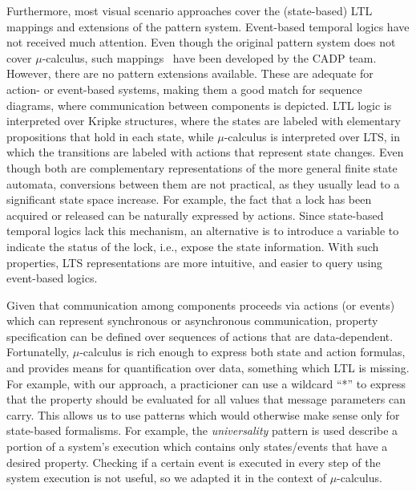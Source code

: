 \documentclass[letter]{llncs}
\begin{document}
Furthermore, most visual scenario approaches cover the (state-based) LTL mappings and extensions of the pattern system. 
Event-based temporal logics have not received much attention. Even though the original pattern 
system does not cover $\mu$-calculus, such mappings~\cite{RAFMC} have been developed by the CADP team.
However, there are no pattern extensions available. These are adequate for action- or event-based systems,
making them a good match for sequence diagrams, where communication between components is depicted.
LTL logic is interpreted over Kripke structures, where the states are labeled with elementary 
propositions that hold in each state, while $\mu$-calculus is interpreted over LTS, in which the transitions
are labeled with actions that represent state changes.
Even though both are complementary representations of the more general finite state automata, 
conversions between them are not practical, as they usually lead to a significant state space increase. 
For example, the fact that a lock has
been acquired or released can be naturally expressed by actions. Since state-based
temporal logics lack this mechanism, an alternative is to introduce a variable to indicate
the status of the lock, i.e., expose the state information. With such properties, LTS
representations are more intuitive, and easier to query using event-based logics.

Given that communication among components proceeds via actions (or events) which can
represent synchronous or asynchronous communication, property specification
can be defined over sequences of actions that are data-dependent.
Fortunatelly, $\mu$-calculus is rich enough to express both state and action formulas,
and provides means for quantification over data, something which LTL is missing. 
For example, with our approach, a practicioner can use 
a wildcard ``*'' to express that the property should be evaluated for all values
that message parameters can carry. This allows us to use patterns which would otherwise
make sense only for state-based formalisms. For example, the \emph{universality}
pattern is used describe a portion of a system's execution which contains only states/events that have a desired property.
Checking if a certain event is executed in every step of the system execution is not useful,
so we adapted it in the context of $\mu$-calculus. 

\end{document}
